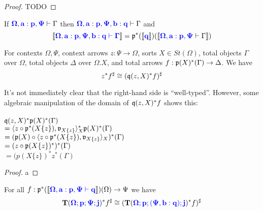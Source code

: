 \documentclass[sigplan,10pt,review,anonymous]{acmart}
\newcommand{\blum}[1]{\mathbf{\color{blue}{#1}}}
\newcommand{\sem}[1]{\llbracket #1 \rrbracket}
\newcommand{\mbf}[1]{\mathbf{#1}}
\begin{document}
\begin{proof}
TODO 
\end{proof}

\begin{corollary}
If $\blum{\Omega, a : p, \Psi} \vdash \Gamma$ then $\blum{\Omega, a : p, \Psi, b : q} \vdash \Gamma$ and $$\sem{\blum{\Omega, a : p, \Psi, b : q \vdash \Gamma}} = \frak p^*(\sem{\blum{q}})(\sem{\blum{\Omega, a : p, \Psi} \vdash \Gamma})$$
\end{corollary}


\begin{lemma}
For contexts $\Omega,\Psi$, context arrows $z : \Psi \to \Omega$, sorts $X \in \mathit{St}(\Omega)$, total objects $\Gamma$ over $\Omega$, total objects $\Delta$ over $\Omega . X$, and total arrows $f : \frak p(X)^*(\Gamma) \to \Delta$. We have 
$$z^*f^\sharp \cong (\frak q(z, X)^* f)^\sharp$$
\end{lemma}

It's not immediately clear that the right-hand side is ``well-typed''. However, some algebraic manipulation of the domain of $\frak q(z, X)^* f$ shows this: \\~\\
$\frak q(z,X)^* \frak p(X)^*(\Gamma)$\\
$= \langle z \circ \frak p^*(X \{ z \}), \frak v_{X \{ z \}} \rangle_X^* \frak p(X)^*(\Gamma)$\\
$= (\frak p(X) \circ \langle z \circ \frak p^*(X \{ z \}), \frak v_{X \{ z \}} \rangle_X)^*(\Gamma)$\\
$= (z \circ \frak p(X \{ z \})^*)^*(\Gamma)$\\
$= (p(X \{ z \})^* z^*(\Gamma)$

\begin{proof}
a
\end{proof}


\begin{lemma}
For all $f : \frak p^*(\sem{\blum{\Omega, a : p, \Psi \vdash q}})(\Omega) \to \Psi$ we have
$$\mbf{T}(\blum{\Omega; p; \Psi; j})^* f^\sharp \cong (\mbf{T}(\blum{\Omega; p ; (\Psi, b : q); j})^* f)^\sharp$$
\end{lemma}
\end{document}
